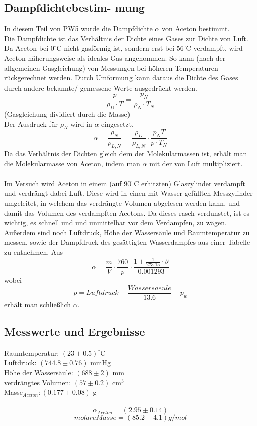 \documentclass[12pt,a4paper]{article}
\begin{document}
\begin{multicols}{2}
\section{Dampfdichtebestim- mung}
In diesem Teil von PW5 wurde die Dampfdichte $\alpha$ von Aceton bestimmt.\\
Die Dampfdichte ist das Verhältnis der Dichte eines Gases zur Dichte von Luft. Da Aceton bei $0 ^\circ$C nicht gasförmig ist, sondern erst bei $56^\circ$C verdampft, wird Aceton näherungsweise als ideales Gas angenommen. So kann (nach der allgemeinen Gasgleichung) von Messungen bei höheren Temperaturen rückgerechnet werden. Durch Umformung kann daraus die Dichte des Gases durch andere bekannte/ gemessene Werte ausgedrückt werden.
$$\frac{p}{\rho_D \cdot T}= \frac{p_N}{\rho_N \cdot T_N}$$ 
(Gasgleichung dividiert durch die Masse)\\
Der Ausdruck für $\rho_N$ wird in $\alpha$ eingesetzt.
$$\alpha = \frac{\rho_N}{\rho_{L,N}}=\frac{\rho_D}{\rho_{L,N}} \cdot \frac{p_N T}{p \cdot T_N}$$
Da das Verhältnis der Dichten gleich dem der Molekularmassen ist, erhält man die Molekularmasse von Aceton, indem man $\alpha$ mit der von Luft multipliziert.\\
\\
Im Versuch wird Aceton in einem (auf $90^\circ$C erhitzten) Glaszylinder verdampft und verdrängt dabei Luft. Diese wird in einen mit Wasser gefüllten Messzylinder umgeleitet, in welchem das verdrängte Volumen abgelesen werden kann, und damit das Volumen des verdampften Acetons.
Da dieses rasch verdunstet, ist es wichtig, es schnell und und unmittelbar vor dem Verdampfen, zu wägen.\\
Außerdem sind noch Luftdruck, Höhe der Wassersäule und Raumtemperatur zu messen, sowie der Dampfdruck des gesättigten Wasserdampfes aus einer Tabelle zu entnehmen. Aus
$$\alpha = \frac{m}{V} \cdot \frac{760}{p} \cdot \frac{1 + \frac{1}{273.15} \cdot \vartheta}{0.001293}$$
wobei
$$p= Luftdruck - \frac{Wassersaeule}{13.6} - p_w$$
erhält man schließlich $\alpha$.

\subsection{Messwerte und Ergebnisse}

Raumtemperatur: $(23\pm 0.5)^\circ$C\\
Luftdruck: $(744.8 \pm 0.76)$ mmHg\\
Höhe der Wassersäule: $(688 \pm 2)$ mm\\
verdrängtes Volumen: $(57 \pm 0.2)$ cm$^3$\\
Masse$_{Aceton}: (0.177 \pm 0.08)$ g\\
\\
$$\alpha_{Aceton} = (2.95 \pm 0.14)$$
$$molare Masse = (85.2 \pm 4.1) g/mol$$




\end{multicols}
\end{document}
